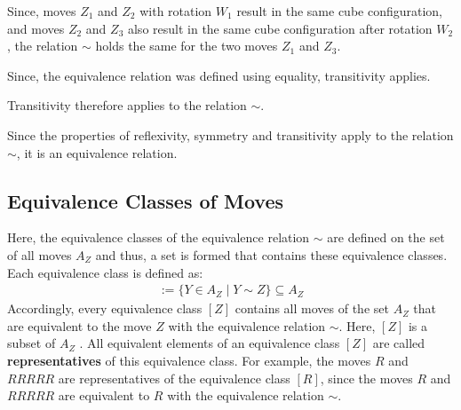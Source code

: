 \documentclass[12pt,a4paper]{article}
\theoremstyle{custom}
\begin{document}
\begin{description}
Since, moves $Z_1$ and $Z_2$ with rotation $W_1$ result in the same cube configuration, and moves $Z_2$ and $Z_3$ also result in the same cube configuration after rotation $W_2$, the relation $\sim$ holds the same for the two moves $Z_1$ and $Z_3$.

Since, the equivalence relation was defined using equality, transitivity applies.


Transitivity therefore applies to the relation $\sim$.

\end{description}

Since the properties of reflexivity, symmetry and transitivity apply to the relation $\sim$, it is an equivalence relation.

\subsection{Equivalence Classes of Moves}
\label{Section_EquivalenceClassesOfMoves}

 Here, the equivalence classes of the equivalence relation $\sim$ are defined on the set of all moves $A_Z$ and thus, a set is formed that contains these equivalence classes. Each equivalence class is defined as:
\begin{align*}
[Z] := \{ Y \in A_Z \mid Y \sim Z \} \subseteq A_Z
\end{align*}
Accordingly, every equivalence class $[Z]$ contains all moves of the set $A_Z$ that are equivalent to the move $Z$ with the equivalence relation $\sim$. Here, $[Z]$ is a subset of $A_Z$ . All equivalent elements of an equivalence class $[Z]$ are called \textbf{representatives} of this equivalence class. For example, the moves $R$ and $RRRRR$ are representatives of the equivalence class $[R]$, since the moves $R$ and $RRRRR$ are equivalent to $R$ with the equivalence relation $\sim$.
\end{document}
